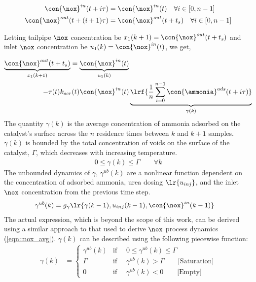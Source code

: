 \begin{align}
    \con{\nox}^{in} (t + i \tau) &= \con{\nox}^{in}(t) \quad \forall i \in [0, n-1]  \label{eqn::zero_in}\\
    \con{\nox}^{out} (t + (i+1) \tau) &= \con{\nox}^{out}(t + t_s) \quad \forall i \in [0, n-1] \label{eqn::zero_out}
\end{align}

Letting tailpipe $\nox$ concentration be $x_1(k+1) = \con{\nox}^{out}(t+t_s)$ and inlet $\nox$ concentration be $u_1(k) = \con{\nox}^{in}(t)$, we get,

\begin{align}
  \underbrace{\con{\nox}^{out}(t+t_s)}_{x_1(k+1)} = \underbrace{\con{\nox}^{in}(t)}_{u_1(k)}& \notag \\
                 - \tau(t) k_{scr}(t) \con{\nox}^{in}(t) & \underbrace{\lrf{\frac{1}{n} \sum_{i = 0}^{n-1} \con{\ammonia}^{ads}(t + i \tau)}}_{\gamma(k)}
        \label{eqn::nox_avg}
\end{align}
%
%
The quantity $\gamma(k)$ is the average concentration of ammonia adsorbed on the catalyst's surface across the $n$ residence times between $k$ and $k+1$ samples. $\gamma(k)$ is bounded by the total concentration of voids on the surface of the catalyst, $\Gamma$, which decreases with increasing temperature.
\begin{align}
    0 \leq \gamma(k) \leq \Gamma \qquad \forall k
\end{align}
The unbounded dynamics of $\gamma$, $\gamma^{ub}(k)$ are a nonlinear function dependent on the concentration of adsorbed ammonia, urea dosing $\lr{u_{inj}}$, and the inlet $\nox$ concentration from the previous time step.
\begin{align}
    \gamma^{ub}(k) &= g_{\gamma} \lr{ \gamma(k-1), u_{inj}(k-1), \con{\nox}^{in}(k-1) }
\end{align}
The actual expression, which is beyond the scope of this work, can be derived using a similar approach to that used to derive
$\nox$ process dynamics (\ref{eqn::nox_avg}). $\gamma(k)$ can be described using the following piecewise
function:
\begin{align}
    \gamma(k) &=
    \begin{cases}
        \gamma^{ub}(k) & \text{if } \quad 0 \leq \gamma^{ub}(k) \leq \Gamma \\
        \Gamma         & \text{if } \quad \gamma^{ub}(k) > \Gamma \qquad \text{[Saturation]}\\
        0              & \text{if } \quad \gamma^{ub}(k) < 0 \qquad \text{[Empty]}
    \end{cases}
\end{align}
